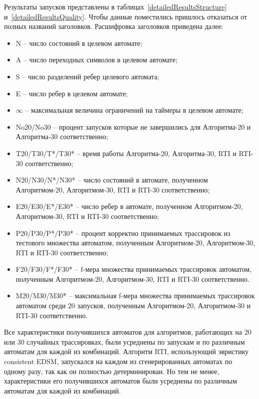 \documentclass[times,specification,annotation]{itmo-student-thesis}
\begin{document}
Результаты запусков представлены в таблицах~\ref{detailedResultsStructure} и~\ref{detailedResultsQuality}.
Чтобы данные поместились пришлось отказаться от полных названий заголовков.
Расшифровка заголовков приведена далее:
\begin{itemize}
  \item N -- число состояний в целевом автомате;
  \item A -- число переходных символов в целевом автомате;
  \item S -- число разделений ребер целевого автомата;
  \item E -- число ребер в целевом автомате;
  \item $\infty$ -- максимальная величина ограничений на таймеры в целевом автомате;
  \item No20\slash No30 -- процент запусков которые не завершились для Алгоритма-20 и Алгоритма-30 соответственно;
  \item T20\slash T30\slash T*\slash T30* -- время работы Алгоритма-20, Алгоритма-30, RTI и RTI-30 соответственно;
  \item N20\slash N30\slash N*\slash N30* -- число состояний в автомате, полученном Алгоритмом-20, Алгоритмом-30, RTI и RTI-30 соответственно;
  \item E20\slash E30\slash E*\slash E30* -- число ребер в автомате, полученном Алгоритмом-20, Алгоритмом-30, RTI и RTI-30 соответственно;
  \item P20\slash P30\slash P*\slash P30* -- процент корректно принимаемых трассировок из тестового множества автоматом, полученным Алгоритмом-20, Алгоритмом-30, RTI и RTI-30 соответственно;
  \item F20\slash F30\slash F*\slash F30* -- f-мера множества принимаемых трассировок автоматом, полученным Алгоритмом-20, Алгоритмом-30, RTI и RTI-30 соответственно.
  \item M20\slash M30\slash M30* -- максимальная f-мера множества принимаемых трассировок автоматом среди $20$ запусков, полученным Алгоритмом-20, Алгоритмом-30 и RTI-30 соответственно.
\end{itemize}

Все характеристики получившихся автоматов для алгоритмов, работающих на $20$ или $30$ случайных трассировках, были усреднены по запускам
и по различным автоматам для каждой из комбинаций. Алгоритм RTI, использующий эвристику consistent EDSM, запускался на каждом из сгенерированных автоматах по одному разу, так как
он полностью детерминирован. Но тем не менее, характеристики его получившихся автоматов были усреднены по различным автоматам для каждой из комбинаций. 
\end{document}
